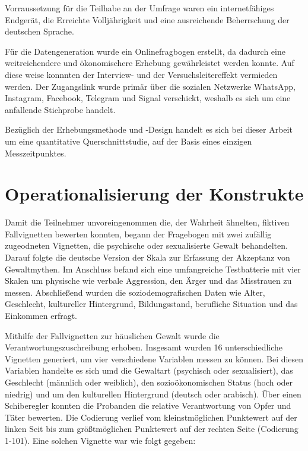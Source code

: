 Vorraussetzung für die Teilhabe an der Umfrage waren ein internetfähiges Endgerät, die Erreichte Volljährigkeit und eine ausreichende Beherrschung der deutschen Sprache. 

Für die Datengeneration wurde ein Onlinefragbogen erstellt, da dadurch eine weitreichendere und ökonomischere Erhebung gewährleistet werden konnte. Auf diese weise konnnten der Interview- und der Versuchsleitereffekt vermieden werden. Der Zugangslink wurde primär über die sozialen Netzwerke WhatsApp, Instagram, Facebook, Telegram und Signal verschickt, weshalb es sich um eine anfallende Stichprobe handelt. 

Bezüglich der Erhebungsmethode und -Design handelt es sich bei dieser Arbeit um eine quantitative Querschnittstudie, auf der Basis eines einzigen Messzeitpunktes.


\section{Operationalisierung der Konstrukte}    \label{sec_3.3}
Damit die Teilnehmer unvoreingenommen die, der Wahrheit ähnelten, fiktiven Fallvignetten bewerten konnten, begann der Fragebogen mit zwei zufällig zugeodneten Vignetten, die psychische oder sexualisierte Gewalt behandelten. Darauf folgte die deutsche Version der Skala zur Erfassung der Akzeptanz von Gewaltmythen. Im Anschluss befand sich eine umfangreiche Testbatterie mit vier Skalen um physische wie verbale Aggression, den Ärger und das Misstrauen zu messen. Abschließend wurden die soziodemografischen Daten wie Alter, Geschlecht, kultureller Hintergrund, Bildungsstand, berufliche Situation und das Einkommen erfragt.

Mithilfe der Fallvignetten zur häuslichen Gewalt wurde die Verantwortungszuschreibung erhoben. Insgesamt wurden 16 unterschiedliche Vignetten generiert, um vier verschiedene Variablen messen zu können. Bei diesen Variablen handelte es sich umd die Gewaltart (psychisch oder sexualisiert), das Geschlecht (männlich oder weiblich), den sozioökonomischen Status (hoch oder niedrig) und um den kulturellen Hintergrund (deutsch oder arabisch). Über einen Schiberegler konnten die Probanden die relative Verantwortung von Opfer und Täter bewerten. Die Codierung verlief vom kleinstmöglichen Punktewert auf der linken Seit bis zum größtmöglichen Punktewert auf der rechten Seite (Codierung 1-101). Eine solchen Vignette war wie folgt gegeben: %


